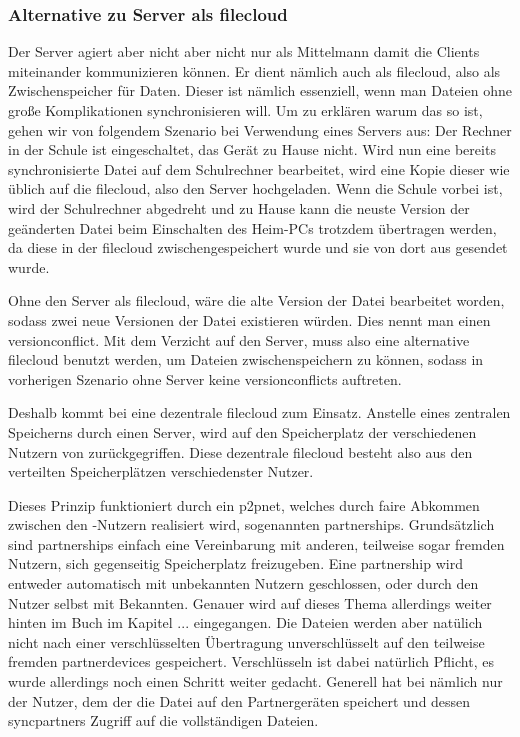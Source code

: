 \subsubsection{Alternative zu Server als \gls{filecloud}}
Der Server agiert aber nicht aber nicht nur als \glqq{} Mittelmann \grqq{} damit die
Clients miteinander kommunizieren können. Er dient nämlich auch als \gls{filecloud},
also als Zwischenspeicher für Daten. Dieser ist nämlich essenziell, wenn man
Dateien ohne große Komplikationen synchronisieren will. Um zu erklären warum das
so ist, gehen wir von folgendem Szenario bei Verwendung eines Servers aus:
Der Rechner in der Schule ist eingeschaltet, das Gerät zu Hause nicht. Wird nun
eine bereits synchronisierte Datei auf dem Schulrechner bearbeitet, wird eine Kopie dieser wie
üblich auf die \gls{filecloud}, also den Server hochgeladen. Wenn die Schule vorbei ist,
wird der Schulrechner abgedreht und zu Hause kann die neuste Version der geänderten Datei beim
Einschalten des Heim-PCs trotzdem übertragen werden, da diese in der \gls{filecloud}
zwischengespeichert wurde und sie von dort aus gesendet wurde.

Ohne den Server als \gls{filecloud}, wäre die alte Version der Datei bearbeitet worden, sodass zwei
neue Versionen der Datei existieren würden. Dies nennt man einen \gls{versionconflict}.
Mit dem Verzicht auf den Server, muss also eine alternative \gls{filecloud} benutzt
werden, um Dateien zwischenspeichern zu können, sodass in vorherigen Szenario ohne Server
keine \glspl{versionconflict} auftreten.

Deshalb kommt bei \sblit eine dezentrale \gls{filecloud} zum Einsatz. Anstelle
eines zentralen Speicherns durch einen Server, wird auf den Speicherplatz der
verschiedenen Nutzern von \sblit zurückgegriffen. Diese dezentrale \gls{filecloud}
besteht also aus den verteilten Speicherplätzen verschiedenster Nutzer.

Dieses Prinzip funktioniert durch ein \gls{p2pnet}, welches durch faire Abkommen zwischen den \sblit-Nutzern realisiert wird,
sogenannten \glspl{partnership}. Grundsätzlich sind \glspl{partnership} einfach eine
Vereinbarung mit anderen, teilweise sogar fremden Nutzern, sich gegenseitig Speicherplatz
freizugeben. Eine \gls{partnership} wird entweder automatisch mit unbekannten Nutzern
geschlossen, oder durch den Nutzer selbst mit Bekannten. Genauer wird auf dieses Thema allerdings weiter hinten im Buch im
Kapitel ... eingegangen.
Die Dateien werden aber natülich nicht nach einer verschlüsselten Übertragung unverschlüsselt
auf den teilweise fremden \glspl{partnerdevice} gespeichert. Verschlüsseln ist dabei
natürlich Pflicht, es wurde allerdings noch einen Schritt weiter gedacht. Generell
hat bei \sblit nämlich nur der Nutzer, dem der die Datei auf den Partnergeräten speichert und
dessen \glspl{syncpartner} Zugriff auf die vollständigen Dateien.

